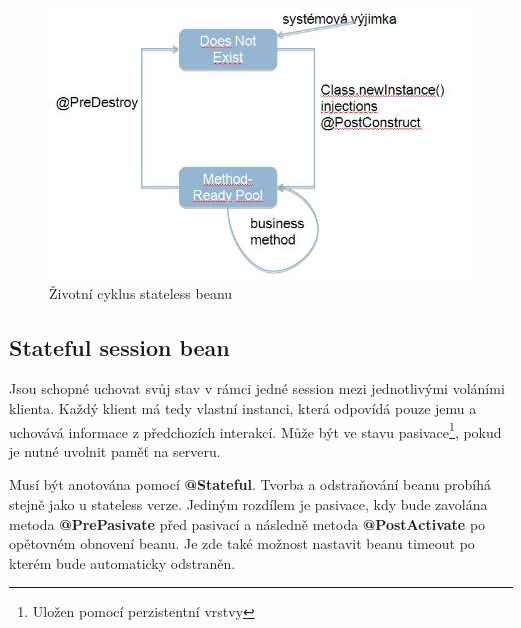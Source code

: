 \documentclass{article}
\begin{document}
\begin{figure}[H]
\begin{center}
\includegraphics[scale=0.5]{Stateless_ejb.jpg}
\caption{Životní cyklus stateless beanu}
\end{center}
\end{figure}

\subsection*{Stateful session bean}

Jsou schopné uchovat svůj stav v rámci jedné session mezi jednotlivými voláními klienta. Každý klient má tedy vlastní instanci, která odpovídá pouze jemu a uchovává informace z předchozích interakcí. Může být ve stavu pasivace\footnote{Uložen pomocí perzistentní vrstvy}, pokud je nutné uvolnit paměť na serveru.\par

Musí být anotována pomocí \textbf{@Stateful}. Tvorba a odstraňování beanu probíhá stejně jako u stateless verze. Jediným rozdílem je pasivace, kdy bude zavolána metoda \textbf{@PrePasivate} před pasivací a následně metoda \textbf{@PostActivate} po opětovném obnovení beanu. Je zde také možnost nastavit beanu timeout po kterém bude automaticky odstraněn.
\end{document}
